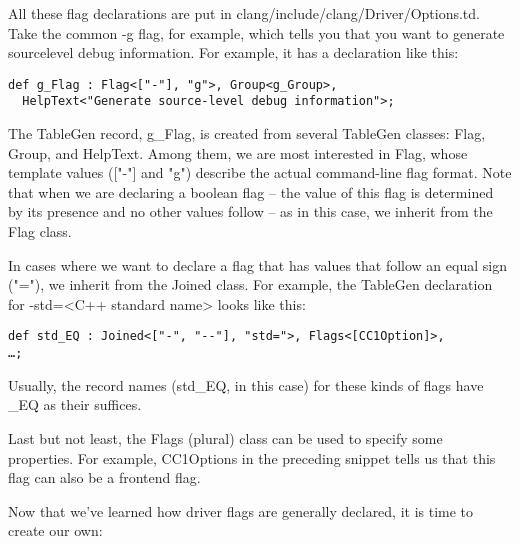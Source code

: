 All these flag declarations are put in clang/include/clang/Driver/Options.td. Take the common -g flag, for example, which tells you that you want to generate sourcelevel debug information. For example, it has a declaration like this:

\begin{lstlisting}[style=stylePython]
def g_Flag : Flag<["-"], "g">, Group<g_Group>,
  HelpText<"Generate source-level debug information">;
\end{lstlisting}

The TableGen record, g\_Flag, is created from several TableGen classes: Flag, Group, and HelpText. Among them, we are most interested in Flag, whose template values (["-"] and "g") describe the actual command-line flag format. Note that when we are declaring a boolean flag – the value of this flag is determined by its presence and no other values follow – as in this case, we inherit from the Flag class.

In cases where we want to declare a flag that has values that follow an equal sign ("="), we inherit from the Joined class. For example, the TableGen declaration for -std=<C++ standard name> looks like this:

\begin{lstlisting}[style=styleJavaScript]
def std_EQ : Joined<["-", "--"], "std=">, Flags<[CC1Option]>,
…;
\end{lstlisting}

Usually, the record names (std\_EQ, in this case) for these kinds of flags have \_EQ as their suffices.

Last but not least, the Flags (plural) class can be used to specify some properties. For example, CC1Options in the preceding snippet tells us that this flag can also be a frontend flag.

Now that we've learned how driver flags are generally declared, it is time to create our own:

